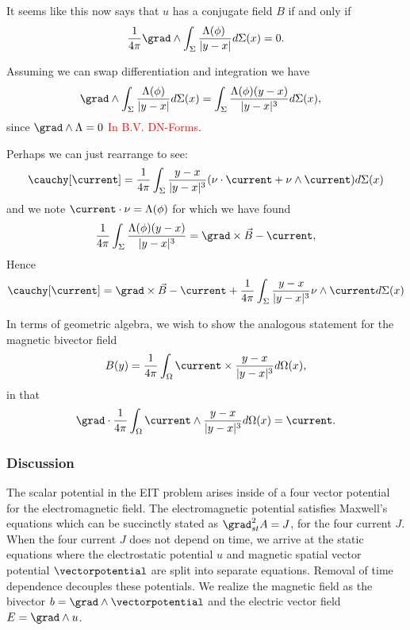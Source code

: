\begin{remark}
    It seems like this now says that $u$ has a conjugate field $B$ if and only if
\[
\frac{1}{4\pi} \grad \wedge \int_\Sigma \frac{\Lambda(\phi)\\}{|y-x|}d\Sigma(x) = 0.
\]
\end{remark}
Assuming we can swap differentiation and integration we have
\begin{align*}
\grad \wedge \int_\Sigma \frac{\Lambda(\phi)}{|y-x|} d\Sigma(x) &= \int_\Sigma \frac{\Lambda(\phi)(y-x)}{|y-x|^3}d\Sigma(x),
\end{align*}
since $\grad \wedge \Lambda = 0$ \textcolor{red}{In B.V. DN-Forms}.

\begin{remark}
Perhaps we can just rearrange to see:
\[
\cauchy [\current] = \frac{1}{4\pi} \int_\Sigma \frac{y-x}{|y-x|^3} (\nu \cdot \current + \nu \wedge \current) d\Sigma(x) 
\]
and we note $\current \cdot \nu = \Lambda(\phi)$ for which we have found
\[
 \frac{1}{4\pi} \int_\Sigma \frac{\Lambda(\phi)(y-x)}{|y-x|^3}=\grad \times \vec{B}-\current,
\]
Hence 
\[
\cauchy[\current] = \grad \times \vec{B} - \current + \frac{1}{4\pi} \int_\Sigma \frac{y-x}{|y-x|^3} \nu \wedge \current d \Sigma(x)
\]
\end{remark}

In terms of geometric algebra, we wish to show the analogous statement for the magnetic bivector field
\[
B(y) = \frac{1}{4\pi} \int_\Omega \current \times \frac{y-x}{|y-x|^3} d\Omega(x),
\] 
in that
\[
\grad \cdot \frac{1}{4\pi} \int_\Omega \current \wedge \frac{y-x}{|y-x|^3} d\Omega(x) = \current.
\]



\subsubsection{Discussion}

The scalar potential in the EIT problem arises inside of a four vector potential for the electromagnetic field.  The electromagnetic potential satisfies Maxwell's equations which can be succinctly stated as $\grad_{st}^2 A = J$, for the four current $J$.  When the four current $J$ does not depend on time, we arrive at the static equations where the electrostatic potential $u$ and magnetic spatial vector potential $\vectorpotential$ are split into separate equations. Removal of time dependence decouples these potentials. We realize the magnetic field as the bivector $b=\grad \wedge \vectorpotential$ and the electric vector field $E=\grad \wedge u$. 

